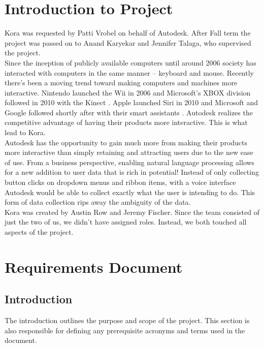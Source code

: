 \documentclass[onecolumn, draftclsnofoot,10pt, compsoc]{IEEEtran}
\newcommand{\newpara}{\\[0.1in]}
\begin{document}

\section{Introduction to Project}
	Kora was requested by Patti Vrobel on behalf of Autodesk.
	After Fall term the project was passed on to Anand Karyekar and Jennifer Talaga, who supervised the project.
	\newpara
	Since the inception of publicly available computers until around 2006 society has interacted with computers in the same manner – keyboard and mouse.
	Recently there’s been a moving trend toward making computers and machines more interactive.
	Nintendo launched the Wii in 2006 and Microsoft’s XBOX division followed in 2010 with the Kinect \cite{wii}\cite{kinect}.
	 Apple launched Siri in 2010 and Microsoft and Google followed shortly after with their smart assistants \cite{siri}.
	 Autodesk realizes the competitive advantage of having their products more interactive.
	 This is what lead to Kora.
	\newpara
	Autodesk has the opportunity to gain much more from making their products more interactive than simply retaining and attracting users due to the new ease of use.
	From a business perspective, enabling natural language processing allows for a new addition to user data that is rich in potential!
	Instead of only collecting button clicks on dropdown menus and ribbon items, with a voice interface Autodesk would be able to collect exactly what the user is intending to do.
	This form of data collection rips away the ambiguity of the data.
	\newpara
	Kora was created by Austin Row and Jeremy Fischer.
	Since the team consisted of just the two of us, we didn't have assigned roles.
	Instead, we both touched all aspects of the project.













\section{Requirements Document}

	\subsection{Introduction}
	The introduction outlines the purpose and scope of the project.
	This section is also responsible for defining any prerequisite acronyms and terms used in the document.
\end{document}
